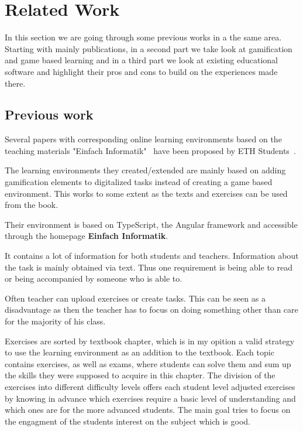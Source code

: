 
\setcounter{chapter}{1}

\chapter{Related Work}\label{ch:relatedwork}
In this section we are going through some previous works in a the same area.
Starting with mainly publications, in a second part we take look at gamification
and game based learning and in a third part we look at existing educational software
and highlight their pros and cons to build on the experiences made there.

\section{Previous work}\label{sec:previous-work}
Several papers with corresponding online learning environments based on the teaching materials "Einfach Informatik"\
\cite{ei56, ei79dat, ei79strat} have been proposed by ETH Students\ \cite{stblum, skamp, tangk, jweber}.

The learning environments they created/extended are mainly based on adding gamification elements to digitalized tasks
instead of creating a game based environment.
This works to some extent as the texts and exercises can be used from the book.

Their environment is based on TypeScript, the Angular framework and accessible through the homepage \textbf{Einfach Informatik}\cite{einfachinformatik}.

It contains a lot of information for both students and teachers.
Information about the task is mainly obtained via text.
Thus one requirement is being able to read or being accompanied by someone who is able to.

Often teacher can upload exercises or create tasks.
This can be seen as a disadvantage as then the teacher has to focus on doing something other than care for the majority
of his class.

Exercises are sorted by textbook chapter, which is in my opition a valid strategy to use the learning environment as an
addition to the textbook.
Each topic contains exercises, as well as exams, where students can solve
them and sum up the skills they were supposed to acquire in this chapter.
The division of the exercises into different difficulty levels offers each student level adjusted exercises by knowing
in advance which exercises require a basic level of understanding and which ones are for the more advanced students.
The main goal tries to focus on the engagment of the students interest on the subject which is good.

